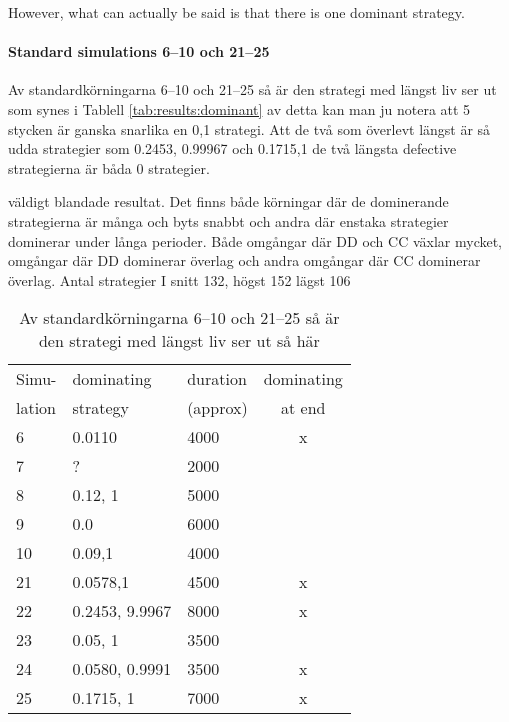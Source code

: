 However, what can actually be said is that there is one dominant strategy.\mypar

\paragraph{Standard simulations 6--10 och 21--25}
Av standardkörningarna 6--10 och 21--25 så är den strategi med längst liv ser ut som synes i Tablell \ref{tab:results:dominant}
av detta kan man ju notera att 5 stycken är ganska snarlika en 0,1 strategi. Att de två som överlevt längst är så udda strategier som 0.2453, 0.99967 och 0.1715,1 de två längsta defective strategierna är båda 0 strategier.\mypar

väldigt blandade resultat. Det finns både körningar där de dominerande strategierna är många och byts
snabbt och andra där enstaka strategier dominerar under långa perioder. Både omgångar där DD och
CC växlar mycket, omgångar där DD dominerar överlag och andra omgångar där CC dominerar
överlag. Antal strategier I snitt 132, högst 152 lägst 106\mypar

\begin{table}[!hbtp]
  \footnotesize
  \centering
  \label{tab:results:dominant610}
  \caption{Av standardkörningarna 6--10 och 21--25 så är den strategi med längst liv ser ut så här}
  
  \begin{tabular}{lllc}
    Simu-  & dominating & duration  & dominating \\
    lation & strategy   & (approx)  & at end \\
    \hline
    6  & 0.0110         & 4000 & x \\          
    7  & ?              & 2000 &            \\ 
    8  & 0.12, 1        & 5000 &            \\ 
    9  & 0.0            & 6000 &            \\ 
    10 & 0.09,1         & 4000 &            \\ 
    21 & 0.0578,1       & 4500 & x \\          
    22 & 0.2453, 9.9967 & 8000 & x \\          
    23 & 0.05, 1        & 3500 &            \\ 
    24 & 0.0580, 0.9991 & 3500 & x \\          
    25 & 0.1715, 1      & 7000 & x \\          
    \hline
  \end{tabular}
\end{table}

